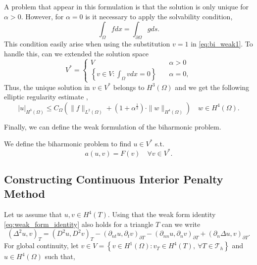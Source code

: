 A problem that appear in this formulation is that the solution is only unique for $\alpha  > 0$. However, for $\alpha  = 0$ is it necessary to apply the solvability condition,
\begin{equation*}
 \int_{\Omega }^{} f dx = \int_{\partial \Omega }^{} g ds
.\end{equation*}
This condition easily arise when using the substitution $v=1$ in \eqref{eq:bi_weak1}. To handle this, can we extended the solution space \[
V^{*} = \begin{cases}
    V \quad & \alpha  > 0 \\
    \left\{ v \in V: \int_{\Omega }^{} v dx  = 0\right\} \quad & \alpha  = 0,
\end{cases}
\]
Thus, the unique solution in $v \in V^{*}$ belongs to $H^{3 }(\Omega ) $ and we get the following
elliptic regularity estimate \cite{gu2012c0},
\begin{equation*}
\label{eq:bi_harmonic_ellitpic_regularity}
\left| u \right| _{H^{3 }\left( \Omega  \right) }  \le C_{\Omega } \left( \| f \|_{  L^{2}( \Omega ) }^{  } + ( 1 + \alpha  ^{\frac{1}{2}}
) \cdot \| w  \|_{ H^{4}\left( \Omega  \right)  }^{  }    \right) \quad w\in H^{4}\left( \Omega  \right).
\end{equation*}

Finally, we can define the weak formulation of the biharmonic problem.

\begin{definition}
    \label{def:biharmonics_problem}

We define the biharmonic problem to find $u \in V^*  $ s.t.
\begin{equation}
a\left( u,v \right) = F(v)\quad \forall v \in
V^* .
\end{equation}

\end{definition}

\subsection{Constructing Continuous Interior Penalty Method}%
\label{sub:constructing_continious_interior_penalty_method}

 Let us assume that $u,v \in
H^{4}\left( T  \right) $. Using that the weak form identity \eqref{eq:weak_form_identity} also holds for a triangle $T$ can we write
\begin{equation}
\label{eq:bi_basic_dg}
\left( \Delta  ^{2} u,v \right) _{T} =  \left( D^2u,D^2v \right) _{T } - \left(\partial _{nt} u, \partial _{t}v
\right)_{\partial T} - \left(\partial _{nn} u, \partial _{n}v \right)_{\partial T} + \left(\partial _{n} \Delta  u,v
\right)_{\partial T}
.\end{equation}
For global continuity, let  $v \in V =  \left\{ v \in H^{1}\left( \Omega  \right): v_{T} \in  H^{4}\left( T \right), \ \forall T \in
\mathcal{T}_{h}    \right\} $ and $u \in  H^{4}\left( \Omega  \right) $ such that,

